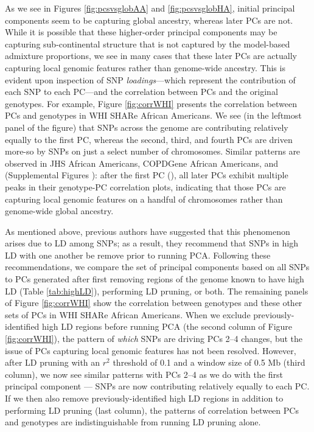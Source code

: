 \documentclass[12pt]{article}
\newcommand{\edit}[1]{{\color{red}{#1}}}
\newcommand{\add}[1]{{\color{red}{[... #1 ...]}}}
\begin{document}
As we see in Figures \ref{fig:pcsvsglobAA} and \ref{fig:pcsvsglobHA}, initial principal components seem to be capturing global ancestry, whereas later PCs are not.
While it is possible that these higher-order principal components may be capturing sub-continental structure that is not captured by the model-based admixture proportions, we see in many cases that these later PCs are actually capturing local genomic features rather than genome-wide ancestry. 
This is evident upon inspection of SNP \textit{loadings}---which represent the contribution of each SNP to each PC---and the correlation between PCs and the original genotypes.
For example, Figure \ref{fig:corrWHI} presents the correlation between PCs and genotypes in WHI SHARe African Americans. 
We see (in the leftmost panel of the figure) that SNPs across the genome are contributing relatively equally to the first PC, whereas the second, third, and fourth PCs are driven more-so by SNPs on just a select number of chromosomes.
\add{For example, the second PC seems to be capturing ... }
Similar patterns are observed in JHS African Americans, COPDGene African Americans, and \add{WHI SHARe Hispanic Americans} (Supplemental Figures \add{??}): after the first PC (\edit{or the second in the case of WHI SHARe Hispanic Americans}), all later PCs exhibit multiple peaks in their genotype-PC correlation plots, indicating that those PCs are capturing local genomic features on a handful of chromosomes rather than genome-wide global ancestry. 

As mentioned above, previous authors have suggested that this phenomenon arises due to LD among SNPs; as a result, they recommend  that SNPs in high LD with one another be remove prior to running PCA. %
Following these recommendations, we compare the set of principal components based on all SNPs to PCs generated after first removing regions of the genome known to have high LD (Table \ref{tab:highLD}), performing LD pruning, or both. 
The remaining panels of Figure \ref{fig:corrWHI} show the correlation between genotypes and these other sets of PCs in WHI SHARe African Americans. 
When we exclude previously-identified high LD regions before running PCA (the second column of Figure \ref{fig:corrWHI}), the pattern of \textit{which} SNPs are driving PCs 2--4 changes, but the issue of PCs capturing local genomic features has not been resolved. 
However, after LD pruning with an $r^2$ threshold of 0.1 and a window size of 0.5 Mb (third column), we now see similar patterns with PCs 2--4 as we do with the first principal component --- SNPs are now contributing relatively equally to each PC. 
If we then also remove previously-identified high LD regions in addition to performing LD pruning (last column), the patterns of correlation between PCs and genotypes are indistinguishable from running LD pruning alone. 
\add{What do we see in WHI SHARe Hispanic Americans?}
\add{What about later PCs?}
\add{What do we see in JHS and COPD? refer to supplement}
\end{document}
